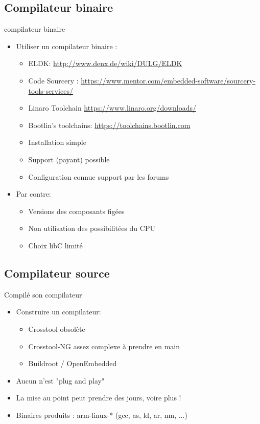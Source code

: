 \subsection{Compilateur binaire}
\begin{frame}{compilateur binaire}
  \begin{itemize}
  \item Utiliser un compilateur binaire :
    \begin{itemize}
    \item ELDK: \url{http://www.denx.de/wiki/DULG/ELDK}
    \item Code Sourcery : \url{https://www.mentor.com/embedded-software/sourcery-tools-services/}
    \item Linaro Toolchain \url{https://www.linaro.org/downloads/}
    \item Bootlin's toolchains: \url{https://toolchains.bootlin.com}
    \item Installation simple
    \item Support (payant) possible
    \item Configuration connue \MVRightarrow support par les forums
    \end{itemize}
  \item Par contre:
    \begin{itemize}
    \item Versions des composants figées
    \item Non utilisation des possibilitées du CPU
    \item Choix libC limité
    \end{itemize}
  \end{itemize}
\end{frame}

\subsection{Compilateur source}
\begin{frame}{Compilé son compilateur}
  \begin{itemize}
  \item Construire un compilateur:
    \begin{itemize}
    \item Crosstool \MVRightarrow obsolète
    \item Crosstool-NG \MVRightarrow assez complexe à prendre en main
    \item Buildroot / OpenEmbedded
    \end{itemize}
  \item Aucun n'est "plug and play"
  \item La mise au point peut prendre des jours, voire plus !
  \item Binaires produits : arm-linux-* (gcc, as, ld, ar, nm, ...)
  \end{itemize}
\end{frame}

